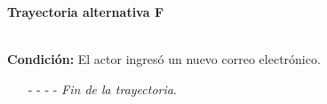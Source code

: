 \hypertarget{CU3-2:TAF}{\textbf{Trayectoria alternativa F}}\\
\noindent \textbf{Condición:} El actor ingresó un nuevo correo electrónico.
\begin{enumerate}
	\UCpaso[\UCsist] Envía un correo con el mensaje  a la nueva cuenta de correo electrónico proporcionada por el actor.
	\UCpaso Regresa al paso \ref{CU3.2-P10} de la trayectoria principal.
	\item[- -] - - {\em {Fin de la trayectoria}}.
\end{enumerate}